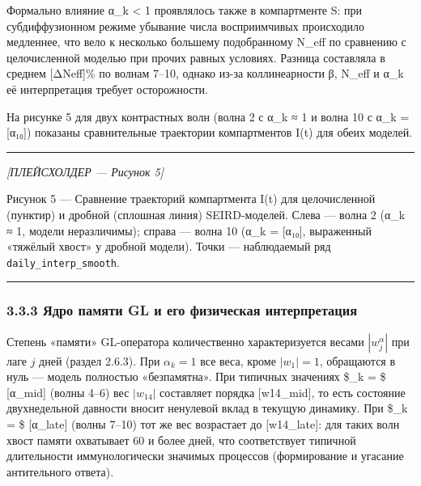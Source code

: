 \documentclass[12pt]{article}
\begin{document}
Формально влияние α\_k \textless{} 1 проявлялось также в компартменте S:
при субдиффузионном режиме убывание числа восприимчивых происходило
медленнее, что вело к несколько большему подобранному N\_eff по
сравнению с целочисленной моделью при прочих равных условиях. Разница
составляла в среднем {[}ΔNeff{]}\% по волнам 7--10, однако из-за
коллинеарности β, N\_eff и α\_k её интерпретация требует осторожности.

На рисунке 5 для двух контрастных волн (волна 2 с α\_k ≈ 1 и волна 10 с
α\_k = {[}α₁₀{]}) показаны сравнительные траектории компартментов I(t)
для обеих моделей.

\begin{center}\rule{0.5\linewidth}{0.5pt}\end{center}

\emph{{[}ПЛЕЙСХОЛДЕР --- Рисунок 5{]}}

Рисунок 5 --- Сравнение траекторий компартмента I(t) для целочисленной
(пунктир) и дробной (сплошная линия) SEIRD-моделей. Слева --- волна 2
(α\_k ≈ 1, модели неразличимы); справа --- волна 10 (α\_k = {[}α₁₀{]},
выраженный «тяжёлый хвост» у дробной модели). Точки --- наблюдаемый ряд
\texttt{daily\_interp\_smooth}.

\begin{center}\rule{0.5\linewidth}{0.5pt}\end{center}

\subsubsection{3.3.3 Ядро памяти GL и его физическая
интерпретация}\label{ux44fux434ux440ux43e-ux43fux430ux43cux44fux442ux438-gl-ux438-ux435ux433ux43e-ux444ux438ux437ux438ux447ux435ux441ux43aux430ux44f-ux438ux43dux442ux435ux440ux43fux440ux435ux442ux430ux446ux438ux44f}

Степень «памяти» GL-оператора количественно характеризуется весами
\(|w_j^\alpha|\) при лаге \(j\) дней (раздел 2.6.3). При
\(\alpha_k = 1\) все веса, кроме \(|w_1| = 1\), обращаются в нуль ---
модель полностью «безпамятна». При типичных значениях \$\hat{\alpha}\_k
= \$ {[}α\_mid{]} (волны 4--6) вес \(|w_{14}|\) составляет порядка
{[}w14\_mid{]}, то есть состояние двухнедельной давности вносит
ненулевой вклад в текущую динамику. При \$\hat{\alpha}\_k = \$
{[}α\_late{]} (волны 7--10) тот же вес возрастает до {[}w14\_late{]}:
для таких волн хвост памяти охватывает 60 и более дней, что
соответствует типичной длительности иммунологически значимых процессов
(формирование и угасание антительного ответа).
\end{document}
